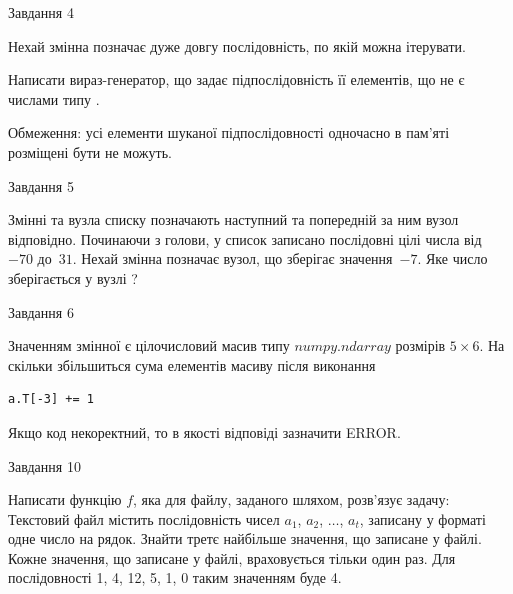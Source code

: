 \documentclass[12pt, ukrainian]{article}
\begin{document}
{               
{\begin{center}Завдання {4}\end{center}}
\vspace{-6mm}
Нехай змінна  позначає дуже довгу послідовність, по якій можна ітерувати.

Написати вираз-генератор, що задає підпослідовність її елементів, що не є числами типу .

Обмеження: усі елементи шуканої підпослідовності одночасно в пам'яті розміщені бути не можуть.\par

\vspace{10mm}
               
{\begin{center}Завдання {5}\end{center}}
\vspace{-6mm}
Змінні  та  вузла списку позначають наступний та попередній за ним вузол відповідно. Починаючи з голови, у список записано послідовні цілі числа від~$-70$ до~$31$. Нехай змінна  позначає вузол, що зберігає значення~$-7$.
Яке число зберігається у вузлі  ?\par

               
{\begin{center}Завдання {6}\end{center}}
\vspace{-6mm}
Значенням змінної  є цілочисловий масив типу $numpy.ndarray$ розмірів $5{\times}6$. На скільки збільшиться сума елементів масиву  після виконання
\begin{verbatim}
a.T[-3] += 1
\end{verbatim}


Якщо код некоректний, то в якості відповіді зазначити ERROR.\par

               
{\begin{center}Завдання {10}\end{center}}
\vspace{-6mm}

Написати функцію $f$, яка для файлу, заданого шляхом, розв’язує задачу:\\ Текстовий файл містить послідовність чисел $a_1$, $a_2$, $\ldots$, $a_t$, записану у форматі одне число на рядок. Знайти третє найбільше значення, що записане у файлі. Кожне значення, що записане у файлі, враховується тільки один раз. Для послідовності 1, 4, 12, 5, 1, 0 таким значенням буде 4.

}
\end{document}
